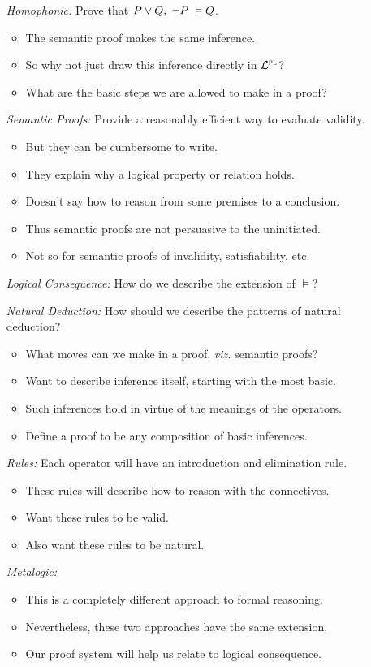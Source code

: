 \documentclass[a4paper, 11pt]{article} %
\begin{document}
\begin{enumerate}
  \item[\it Homophonic:] Prove that $P \vee Q,\ \neg P\ \vDash Q$. 
    \begin{itemize}
      \item The semantic proof makes the same inference.
      \item So why not just draw this inference directly in $\mathcal{L}^{\textsc{pl}}$?
      \item What are the basic steps we are allowed to make in a proof?
    \end{itemize}
  \item[\it Semantic Proofs:] Provide a reasonably efficient way to evaluate validity.
    \begin{itemize}
      \item But they can be cumbersome to write.
      \item They explain why a logical property or relation holds.
      \item Doesn't say how to reason from some premises to a conclusion.
      \item Thus semantic proofs are not persuasive to the uninitiated.
      \item Not so for semantic proofs of invalidity, satisfiability, etc.
    \end{itemize}
  \item[\it Logical Consequence:] How do we describe the extension of $\vDash$? 
  \item[\it Natural Deduction:] How should we describe the patterns of natural deduction?
    \begin{itemize}
      \item What moves can we make in a proof, \textit{viz.} semantic proofs?
      \item Want to describe inference itself, starting with the most basic.
      \item Such inferences hold in virtue of the meanings of the operators.
      \item Define a proof to be any composition of basic inferences.
    \end{itemize}
  \item[\it Rules:] Each operator will have an introduction and elimination rule.
    \begin{itemize}
      \item These rules will describe how to reason with the connectives.
      \item Want these rules to be valid.
      \item Also want these rules to be natural.
    \end{itemize}
  \item[\it Metalogic:] 
    \begin{itemize}
      \item This is a completely different approach to formal reasoning.
      \item Nevertheless, these two approaches have the same extension.
      \item Our proof system will help us relate to logical consequence.
    \end{itemize}
\end{enumerate}
\end{document}
